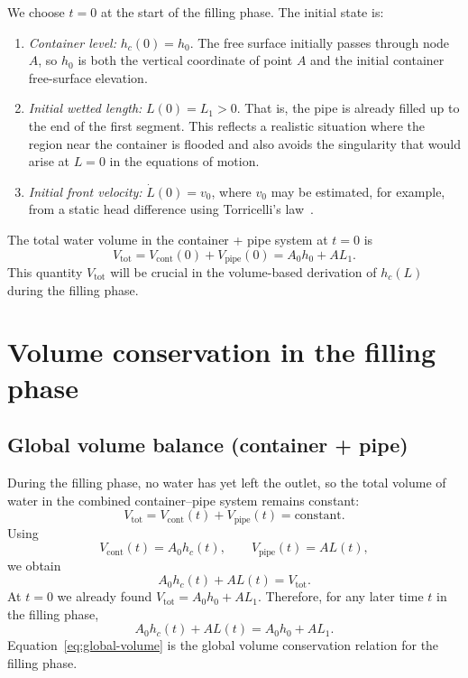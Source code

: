 \documentclass[11pt]{article}
\begin{document}
We choose $t = 0$ at the start of the filling phase. The initial state is:
\begin{enumerate}
  \item \emph{Container level:} $h_c(0) = h_0$. The free surface initially passes through
        node $A$, so $h_0$ is both the vertical coordinate of point $A$ and the initial
        container free-surface elevation.
  \item \emph{Initial wetted length:} $L(0) = L_1 > 0$. That is, the pipe is already filled
        up to the end of the first segment. This reflects a realistic situation where the region
        near the container is flooded and also avoids the singularity that would arise at
        $L = 0$ in the equations of motion.
  \item \emph{Initial front velocity:} $\dot L(0) = v_0$, where $v_0$ may be estimated,
        for example, from a static head difference using Torricelli's law~\cite{white}.
\end{enumerate}
The total water volume in the container + pipe system at $t = 0$ is
\[
  V_{\text{tot}}
  = V_{\text{cont}}(0) + V_{\text{pipe}}(0)
  = A_0 h_0 + A L_1.
\]
This quantity $V_{\text{tot}}$ will be crucial in the volume-based derivation of $h_c(L)$ during
the filling phase.

\section{Volume conservation in the filling phase}

\subsection{Global volume balance (container + pipe)}

During the filling phase, no water has yet left the outlet, so the total volume of water in the
combined container--pipe system remains constant:
\[
  V_{\text{tot}} = V_{\text{cont}}(t) + V_{\text{pipe}}(t) = \text{constant}.
\]
Using
\[
  V_{\text{cont}}(t) = A_0 h_c(t),\qquad
  V_{\text{pipe}}(t) = A L(t),
\]
we obtain
\[
  A_0 h_c(t) + A L(t) = V_{\text{tot}}.
\]
At $t = 0$ we already found $V_{\text{tot}} = A_0 h_0 + A L_1$. Therefore, for any later time
$t$ in the filling phase,
\begin{equation}
  A_0 h_c(t) + A L(t) = A_0 h_0 + A L_1.
  \label{eq:global-volume}
\end{equation}
Equation~\eqref{eq:global-volume} is the global volume conservation relation for the filling phase.
\end{document}
